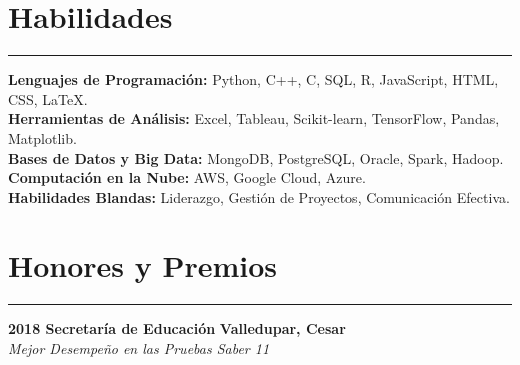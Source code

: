 \documentclass[9pt,a4paper]{article}
\newcommand{\cvevent}[4]{%
  {\noindent \textbf{#1 #2} \hfill \textbf{#3}\\%
   \textit{#4}\\[0pt]}%
}
\begin{document}
\section*{Habilidades}
\vspace{-\baselineskip}
\noindent\rule{\linewidth}{0.5pt}

\textbf{Lenguajes de Programación:} Python, C++, C, SQL, R, JavaScript, HTML, CSS, LaTeX.\\
\textbf{Herramientas de Análisis:} Excel, Tableau, Scikit-learn, TensorFlow, Pandas, Matplotlib.\\
\textbf{Bases de Datos y Big Data:} MongoDB, PostgreSQL, Oracle, Spark, Hadoop.\\
\textbf{Computación en la Nube:} AWS, Google Cloud, Azure.\\
\textbf{Habilidades Blandas:} Liderazgo, Gestión de Proyectos, Comunicación Efectiva.

\section*{Honores y Premios}
\vspace{-\baselineskip}
\noindent\rule{\linewidth}{0.5pt}

\cvevent{2018}{Secretaría de Educación}{Valledupar, Cesar}{Mejor Desempeño en las Pruebas Saber 11}
\vspace{-\baselineskip}
\end{document}
